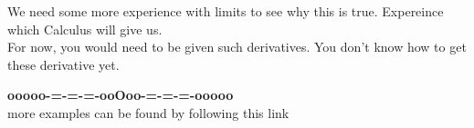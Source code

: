 \documentclass{ximera}
\begin{document}
We need some more experience with limits to see why this is true. Expereince which Calculus will give us. \\


For now, you would need to be given such derivatives.  You don't know how to get these derivative yet.




\begin{center}
\textbf{\textcolor{green!50!black}{ooooo-=-=-=-ooOoo-=-=-=-ooooo}} \\

more examples can be found by following this link\\ 

\end{center}
\end{document}
